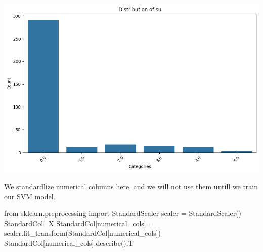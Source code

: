 \documentclass[
  11pt,
  letterpaper,
  DIV=11,
  numbers=noendperiod]{scrartcl}
\newenvironment{Shaded}{\begin{snugshade}}{\end{snugshade}}
\newcommand{\ImportTok}[1]{\textcolor[rgb]{0.00,0.46,0.62}{#1}}
\newcommand{\NormalTok}[1]{\textcolor[rgb]{0.00,0.23,0.31}{#1}}
\newcommand{\OperatorTok}[1]{\textcolor[rgb]{0.37,0.37,0.37}{#1}}
\begin{document}
\includegraphics{Assignment6_Final version_files/figure-pdf/cell-15-output-12.png}

We standardlize numerical columns here, and we will not use them untill
we train our SVM model.

\begin{Shaded}
\begin{Highlighting}[]

\ImportTok{from}\NormalTok{ sklearn.preprocessing }\ImportTok{import}\NormalTok{ StandardScaler}
\NormalTok{scaler }\OperatorTok{=}\NormalTok{ StandardScaler()}
\NormalTok{StandardCol}\OperatorTok{=}\NormalTok{X}
\NormalTok{StandardCol[numerical\_cols] }\OperatorTok{=}\NormalTok{ scaler.fit\_transform(StandardCol[numerical\_cols])}
\NormalTok{StandardCol[numerical\_cols].describe().T}
\end{Highlighting}
\end{Shaded}
\end{document}
